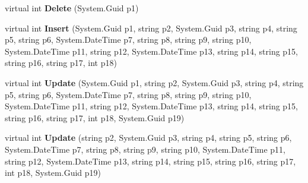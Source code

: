 \begin{DoxyCompactItemize}
\item 
virtual int {\bfseries Delete} (System.\+Guid p1)\hypertarget{class_products_1_1_data_1_1ds_sage_table_adapters_1_1ta_kundenmaschine_a26776e132d5ba53b7d18b1ce93782cc7}{}\label{class_products_1_1_data_1_1ds_sage_table_adapters_1_1ta_kundenmaschine_a26776e132d5ba53b7d18b1ce93782cc7}

\item 
virtual int {\bfseries Insert} (System.\+Guid p1, string p2, System.\+Guid p3, string p4, string p5, string p6, System.\+Date\+Time p7, string p8, string p9, string p10, System.\+Date\+Time p11, string p12, System.\+Date\+Time p13, string p14, string p15, string p16, string p17, int p18)\hypertarget{class_products_1_1_data_1_1ds_sage_table_adapters_1_1ta_kundenmaschine_a61c4b1e231fac373a04884f4672a2b1c}{}\label{class_products_1_1_data_1_1ds_sage_table_adapters_1_1ta_kundenmaschine_a61c4b1e231fac373a04884f4672a2b1c}

\item 
virtual int {\bfseries Update} (System.\+Guid p1, string p2, System.\+Guid p3, string p4, string p5, string p6, System.\+Date\+Time p7, string p8, string p9, string p10, System.\+Date\+Time p11, string p12, System.\+Date\+Time p13, string p14, string p15, string p16, string p17, int p18, System.\+Guid p19)\hypertarget{class_products_1_1_data_1_1ds_sage_table_adapters_1_1ta_kundenmaschine_ac8cfc4434e13e37b5cdbf227196b66c2}{}\label{class_products_1_1_data_1_1ds_sage_table_adapters_1_1ta_kundenmaschine_ac8cfc4434e13e37b5cdbf227196b66c2}

\item 
virtual int {\bfseries Update} (string p2, System.\+Guid p3, string p4, string p5, string p6, System.\+Date\+Time p7, string p8, string p9, string p10, System.\+Date\+Time p11, string p12, System.\+Date\+Time p13, string p14, string p15, string p16, string p17, int p18, System.\+Guid p19)\hypertarget{class_products_1_1_data_1_1ds_sage_table_adapters_1_1ta_kundenmaschine_ac53fa596db61dba21d33a66b9370642f}{}\label{class_products_1_1_data_1_1ds_sage_table_adapters_1_1ta_kundenmaschine_ac53fa596db61dba21d33a66b9370642f}

\end{DoxyCompactItemize}
